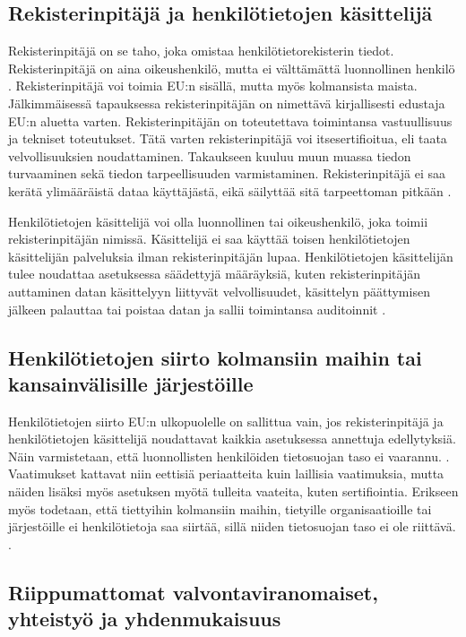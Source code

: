 \documentclass[finnish]{tktltiki}
\begin{document}
\subsection{Rekisterinpitäjä ja henkilötietojen käsittelijä}

Rekisterinpitäjä on se taho, joka omistaa henkilötietorekisterin tiedot. Rekisterinpitäjä on aina oikeushenkilö, mutta ei välttämättä luonnollinen henkilö \cite{eu2016}. Rekisterinpitäjä voi toimia EU:n sisällä, mutta myös kolmansista maista. Jälkimmäisessä tapauksessa rekisterinpitäjän on nimettävä kirjallisesti edustaja EU:n aluetta varten. Rekisterinpitäjän on toteutettava toimintansa vastuullisuus ja tekniset toteutukset. Tätä varten rekisterinpitäjä voi itsesertifioitua, eli taata velvollisuuksien noudattaminen. Takaukseen kuuluu muun muassa tiedon turvaaminen sekä tiedon tarpeellisuuden varmistaminen. Rekisterinpitäjä ei saa kerätä ylimääräistä dataa käyttäjästä, eikä säilyttää sitä tarpeettoman pitkään \cite{eu2016,tikkinen}. 

Henkilötietojen käsittelijä voi olla luonnollinen tai oikeushenkilö, joka toimii rekisterinpitäjän nimissä. Käsittelijä ei saa käyttää toisen henkilötietojen käsittelijän palveluksia ilman rekisterinpitäjän lupaa. Henkilötietojen käsittelijän tulee noudattaa asetuksessa säädettyjä määräyksiä, kuten rekisterinpitäjän auttaminen datan käsittelyyn liittyvät velvollisuudet, käsittelyn päättymisen jälkeen palauttaa tai poistaa datan ja sallii toimintansa auditoinnit \cite{eu2016,tikkinen}.

\subsection{Henkilötietojen siirto kolmansiin maihin tai kansainvälisille järjestöille}

Henkilötietojen siirto EU:n ulkopuolelle on sallittua vain, jos rekisterinpitäjä ja henkilötietojen käsittelijä noudattavat kaikkia asetuksessa annettuja edellytyksiä. Näin varmistetaan, että luonnollisten henkilöiden tietosuojan taso ei vaarannu. \cite{eu2016}. Vaatimukset kattavat niin eettisiä periaatteita kuin laillisia vaatimuksia, mutta näiden lisäksi myös asetuksen myötä tulleita vaateita, kuten sertifiointia. Erikseen myös todetaan, että tiettyihin kolmansiin maihin, tietyille organisaatioille tai järjestöille ei henkilötietoja saa siirtää, sillä niiden tietosuojan taso ei ole riittävä. \cite{eu2016}.

\subsection{Riippumattomat valvontaviranomaiset, yhteistyö ja yhdenmukaisuus}
\end{document}
